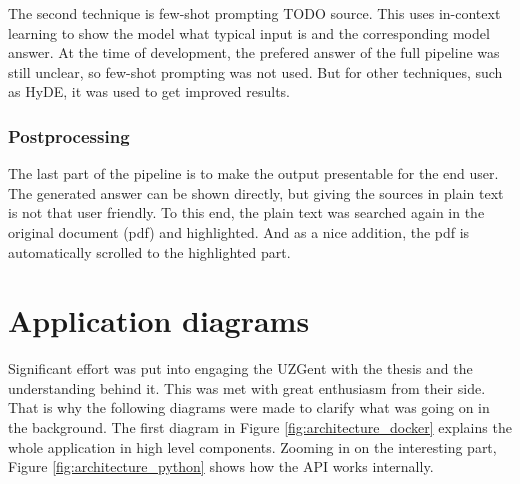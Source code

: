 The second technique is few-shot prompting TODO source. This uses in-context learning to show the model what typical input is and the corresponding model answer. At the time of development, the prefered answer of the full pipeline was still unclear, so few-shot prompting was not used. But for other techniques, such as HyDE, it was used to get improved results. 

\subsubsection{Postprocessing}
The last part of the pipeline is to make the output presentable for the end user. The generated answer can be shown directly, but giving the sources in plain text is not that user friendly. To this end, the plain text was searched again in the original document (pdf) and highlighted. And as a nice addition, the pdf is automatically scrolled to the highlighted part.

\section{Application diagrams}
Significant effort was put into engaging the UZGent with the thesis and the understanding behind it. This was met with great enthusiasm from their side. That is why the following diagrams were made to clarify what was going on in the background. The first diagram in Figure \ref{fig:architecture_docker} explains the whole application in high level components. Zooming in on the interesting part, Figure \ref{fig:architecture_python} shows how the API works internally.


